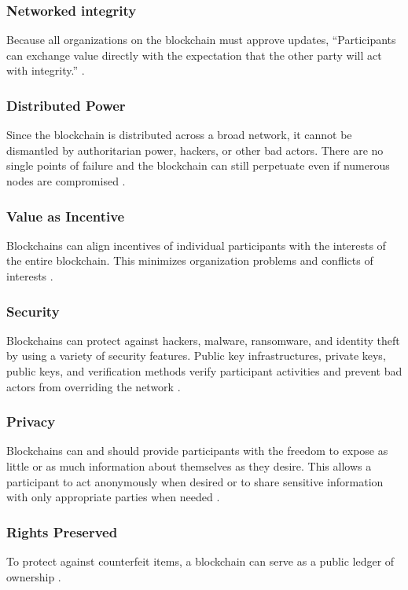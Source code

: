\documentclass[sigconf]{acmart}
\begin{document}
\subsubsection{Networked integrity} Because all organizations on the blockchain must approve updates, ``Participants can exchange value directly with the expectation that the other party will act with integrity.'' \cite{tapscott}. 

\subsubsection{Distributed Power} Since the blockchain is distributed across a broad network, it cannot be dismantled by authoritarian power, hackers, or other bad actors. There are no single points of failure and the blockchain can still perpetuate even if numerous nodes are compromised \cite{tapscott}.

\subsubsection{Value as Incentive} Blockchains can align incentives of individual participants with the interests of the entire blockchain. This minimizes organization problems and conflicts of interests \cite{tapscott}.

\subsubsection{Security} Blockchains can protect against hackers, malware, ransomware, and identity theft by using a variety of security features. Public key infrastructures, private keys, public keys, and verification methods verify participant activities and prevent bad actors from overriding the network \cite{tapscott}. 

\subsubsection{Privacy} Blockchains can and should provide participants with the freedom to expose as little or as much information about themselves as they desire. This allows a participant to act anonymously when desired or to share sensitive information with only appropriate parties when needed \cite{tapscott}.

\subsubsection{Rights Preserved} To protect against counterfeit items, a blockchain can serve as a public ledger of ownership \cite{tapscott}.
\end{document}
